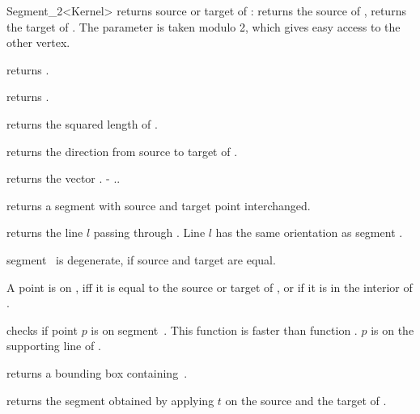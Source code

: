 \begin{ccRefClass} {Segment_2<Kernel>}
       {returns source or target   of \ccVar:    returns
        the source of \ccVar,  returns the target of \ccVar. 
        The parameter  is taken modulo 2, which gives 
        easy access to the other vertex. }

        {returns .}

       {returns .}

       {returns the squared length of \ccVar. }

       {returns the direction from source to target of \ccVar.}

       {returns the vector \ccVar. - \ccVar..}


       {returns a segment with source and target point interchanged.}

       {returns the line $l$ passing through \ccVar. Line $l$  has the
        same orientation as segment \ccVar.}

\ccPredicates

       {segment \ccVar\ is degenerate, if source and target are equal.}

       {}
\ccGlue
{}
       {}

       {A point is on \ccVar, iff it is equal to the source or target 
        of \ccVar, or if it is in the interior of \ccVar.}

       {checks if point $p$ is on segment~\ccVar. This function is faster
        than function .
        \ccPrecond $p$ is on the supporting line of \ccVar.}


       {returns a bounding box containing~\ccVar.}

       {returns the segment obtained by applying $t$ on the source
        and the target of \ccVar.}

\ccSeeAlso
{}\\

\end{ccRefClass} 

